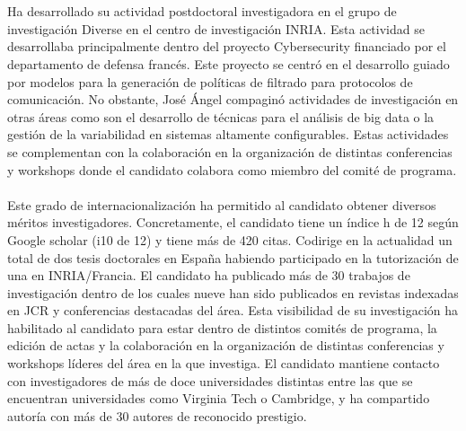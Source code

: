 \\\\
Ha desarrollado su actividad postdoctoral investigadora en el grupo de investigación Diverse en el centro de investigación INRIA. Esta actividad se desarrollaba principalmente dentro del proyecto Cybersecurity financiado por el departamento de defensa francés. Este proyecto se centró en el desarrollo guiado por modelos para la generación de políticas de filtrado para protocolos de comunicación. No obstante, José Ángel compaginó actividades de investigación en otras áreas como son el desarrollo de técnicas para el análisis de big data o la gestión de la variabilidad en sistemas altamente configurables. Estas actividades se complementan con la colaboración en la organización de distintas conferencias y workshops donde el candidato colabora como miembro del comité de programa. 
\\\\
Este grado de internacionalización ha permitido al candidato obtener diversos méritos investigadores. Concretamente, el candidato tiene un índice h de 12 según Google scholar (i10 de 12) y tiene más de 420 citas. Codirige en la actualidad un total de dos tesis doctorales en España habiendo participado en la tutorización de una en INRIA/Francia. El candidato ha publicado más de 30 trabajos de investigación dentro de los cuales nueve han sido publicados en revistas indexadas en JCR y conferencias destacadas del área. Esta visibilidad de su investigación ha habilitado al candidato para estar dentro de distintos comités de programa, la edición de actas y la colaboración en la organización de distintas conferencias y workshops líderes del área en la que investiga. El candidato mantiene contacto con investigadores de más de doce universidades distintas entre las que se encuentran universidades como Virginia Tech o Cambridge, y ha compartido autoría con más de 30 autores de reconocido prestigio.   